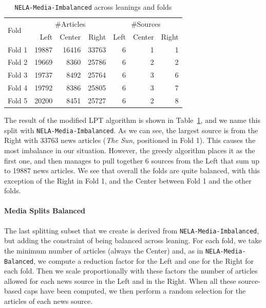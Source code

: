 

\begin{table}[!htbp]
    \centering
    \begin{tabular}{l|rrr|rrr}
        \multirow{2}{*}{Fold} & \multicolumn{3}{c}{\#Articles} & \multicolumn{3}{c}{\#Sources} \\
         & Left & Center & Right & Left & Center & Right \\
        \hline
        Fold 1 & 19887 & 16416 & 33763 & 6 & 1 & 1 \\
        Fold 2 & 19669 & 8360 & 25786 & 6 & 2 & 2 \\
        Fold 3 & 19737 & 8492 & 25764 & 6 & 3 & 6 \\
        Fold 4 & 19792 & 8386 & 25805 & 6 & 3 & 7 \\
        Fold 5 & 20200 & 8451 & 25727 & 6 & 2 & 8 \\
    \end{tabular}
    \caption{\texttt{NELA-Media-Imbalanced} across leanings and folds}
    \label{tab:nela_media_imbalanced}
\end{table}

The result of the modified LPT algorithm is shown in Table~\ref{tab:nela_media_imbalanced}, and we name this split with \texttt{NELA-Media-Imbalanced}.
As we can see, the largest source is from the Right with 33763 news articles (\emph{The Sun}, positioned in Fold 1). This causes the most imbalance in our situation. However, the greedy algorithm places it as the first one, and then manages to pull together 6 sources from the Left that sum up to 19887 news articles.
We see that overall the folds are quite balanced, with this exception of the Right in Fold 1, and the Center between Fold 1 and the other folds.

\paragraph{Media Splits Balanced}

The last splitting subset that we create is derived from \texttt{NELA-Media-Imbalanced}, but adding the constraint of being balanced across leaning.
For each fold, we take the minimum number of articles (always the Center) and, as in \texttt{NELA-Media-Balanced}, we compute a reduction factor for the Left and one for the Right for each fold. Then we scale proportionally with these factors the number of articles allowed for each news source in the Left and in the Right. When all these source-based caps have been computed, we then perform a random selection for the articles of each news source.  

